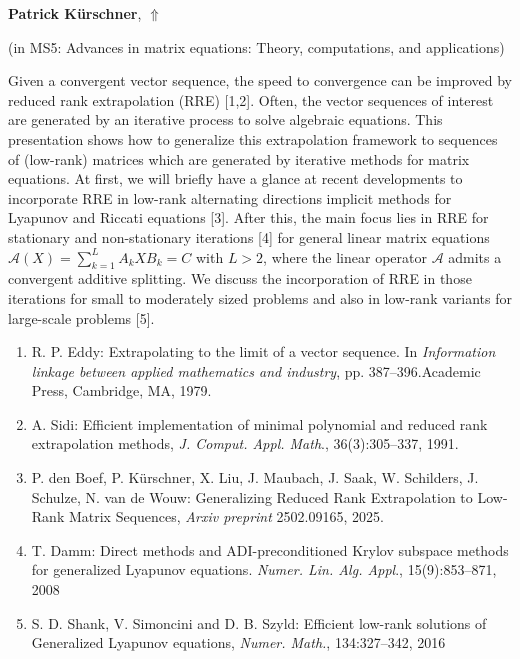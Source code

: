 \documentclass[ILAS2025-program.tex]{subfiles}
\begin{document}
\hypertarget{down0321}{}\begin{ilasabstract}
    
\textbf{Patrick Kürschner},  \hfill \hyperlink{up0321}{$\Uparrow$}
    
    
(in {\color{mstitle}MS5: Advances in matrix equations: Theory, computations, and applications})
        
\mtskip
    Given a convergent vector sequence, the speed to convergence can be improved by  reduced rank extrapolation (RRE) [1,2]. Often, the vector sequences of interest are generated by an iterative process to solve algebraic equations.
This presentation shows how to  generalize  this extrapolation framework to sequences of (low-rank) matrices which are generated by iterative methods for matrix equations. At first, we will briefly have a glance at recent developments to incorporate RRE  in low-rank alternating directions implicit methods for Lyapunov and Riccati equations [3]. 
After this, the main focus lies in RRE for stationary and non-stationary iterations [4] for general linear matrix equations
$\mathcal{A}(X)=\sum\limits_{k=1}^LA_kXB_k=C$ with $L>2$, where the linear operator $\mathcal{A}$ admits a convergent additive splitting. We discuss the incorporation of RRE in those iterations for small to moderately sized problems and
also in low-rank variants for large-scale problems [5].


\begin{enumerate}
 \item R. P. Eddy: Extrapolating to the limit of a vector sequence. In \textit{Information linkage between applied mathematics and industry}, pp. 387–396.Academic Press, Cambridge, MA, 1979.
 \item     A. Sidi: Efficient implementation of minimal polynomial and reduced
    rank extrapolation methods, \textit{J. Comput. Appl. Math}., 36(3):305–337,  1991.
  \item    P. den Boef, P. Kürschner, X. Liu, J. Maubach, J. Saak, W. Schilders, J. Schulze, N. van de Wouw: Generalizing Reduced Rank Extrapolation to Low-Rank Matrix Sequences, \textit{Arxiv preprint} 2502.09165, 2025.
  \item T. Damm: Direct methods and ADI-preconditioned Krylov subspace methods for generalized Lyapunov equations. \textit{Numer. Lin. Alg. Appl}., 15(9):853–871, 2008
  \item     S. D. Shank, V. Simoncini and D. B. Szyld: Efficient low-rank solutions of Generalized Lyapunov equations, \textit{Numer. Math.}, 134:327–342, 2016
\end{enumerate}
    

 


\end{ilasabstract}
    
\end{document}
